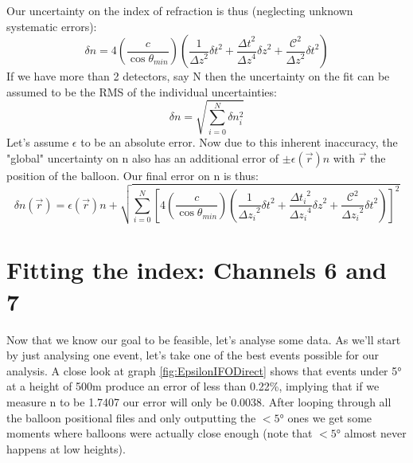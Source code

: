\documentclass[11pt,a4paper,faculty=we,language=en,doctype=report]{cls/ugent-doc}
\begin{document}
Our uncertainty on the index of refraction is thus (neglecting unknown systematic errors):
\begin{equation}
	\delta n =4\left(\frac{c}{\cos{\theta_{min}}}\right) \left( \frac{1}{{\Delta z}^2}{\delta t}^2 + \frac{{\Delta t}^2}{{\Delta z}^4}{\delta z}^2 + 
\frac{\mathcal{C}^2}{{\Delta z}^2}{\delta t}^2\right)
\end{equation}
If we have more than 2 detectors, say N then the uncertainty on the fit can be assumed to be the
RMS of the individual uncertainties:
\begin{equation}
  \delta n =\sqrt{\sum_{i=0}^N \delta n _i^2}
\end{equation}
Let's assume $\epsilon$ to be an absolute error.  Now due to this inherent
inaccuracy, the "global" uncertainty on n also has an additional error of $\pm \epsilon(\vec{r})n$ with
$\vec{r}$ the position of the balloon.  Our final error on n is thus:
\begin{equation}
  \delta n(\vec{r})=  \epsilon(\vec{r})n + \sqrt{\sum_{i=0}^N \left[4\left(\frac{c}{\cos{\theta_{min}}}\right) \left( \frac{1}{{\Delta z_i}^2}{\delta t}^2 + \frac{{\Delta t_i}^2}{{\Delta z_i}^4}{\delta z}^2 + 
  \frac{\mathcal{C}^2}{{\Delta z_i}^2}{\delta t}^2\right)\right]^2 }
  \label{eqn:total error}
\end{equation}
\newpage
\section{Fitting the index: Channels 6 and 7}
Now that we know our goal to be feasible, let's analyse some data.  As we'll
start by just analysing one event, let's take one of the best events possible
for our analysis.  A close look at graph \ref{fig:EpsilonIFODirect} shows that
events under 5° at a height of 500m produce an error of less than 0.22\%,
implying that if we measure n to be 1.7407 our error will only be 0.0038. After
looping through all the balloon positional files and only outputting the $<5°$
ones we get some moments where balloons were actually close enough (note that
$<5°$ almost never happens at low heights).
\end{document}
